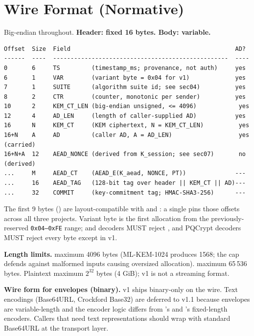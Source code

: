 \section{Wire Format (Normative)}
\label{sec:wire-format}

Big-endian throughout. \textbf{Header: fixed 16 bytes. Body: variable.}

\begin{lstlisting}[language=Pseudocode]
Offset  Size  Field                                               AD?
------  ----  --------------------------------------------------  ----
0       6     TS         (timestamp_ms; provenance, not auth)     yes
6       1     VAR        (variant byte = 0x04 for v1)             yes
7       1     SUITE      (algorithm suite id; see sec04)          yes
8       2     CTR        (counter, monotonic per sender)          yes
10      2     KEM_CT_LEN (big-endian unsigned, <= 4096)            yes
12      4     AD_LEN     (length of caller-supplied AD)           yes
16      N     KEM_CT     (KEM ciphertext, N = KEM_CT_LEN)          yes
16+N    A     AD         (caller AD, A = AD_LEN)                   yes (carried)
16+N+A  12    AEAD_NONCE (derived from K_session; see sec07)       no  (derived)
...     M     AEAD_CT    (AEAD_E(K_aead, NONCE, PT))              ---
...     16    AEAD_TAG   (128-bit tag over header || KEM_CT || AD)---
...     32    COMMIT     (key-commitment tag; HMAC-SHA3-256)      ---
\end{lstlisting}

The first 9 bytes () are layout-compatible with \pqid{} and \pqhash{}: a single  pins those offsets across all three projects. Variant byte  is the first allocation from the previously-reserved \texttt{0x04--0xFE} range; \pqid{} and \pqhash{} decoders MUST reject , and PQCrypt decoders MUST reject every byte except  in v1.

\textbf{Length limits.}  maximum 4096 bytes (ML-KEM-1024 produces 1568; the cap defends against malformed inputs causing oversized allocation).  maximum 65\,536 bytes. Plaintext maximum $2^{32}$ bytes (4 GiB); v1 is not a streaming format.

\textbf{Wire form for envelopes (binary).} v1 ships binary-only on the wire. Text encodings (Base64URL, Crockford Base32) are deferred to v1.1 because envelopes are variable-length and the encoder logic differs from \pqid{}'s and \pqhash{}'s fixed-length encoders. Callers that need text representations should wrap with standard Base64URL at the transport layer.
